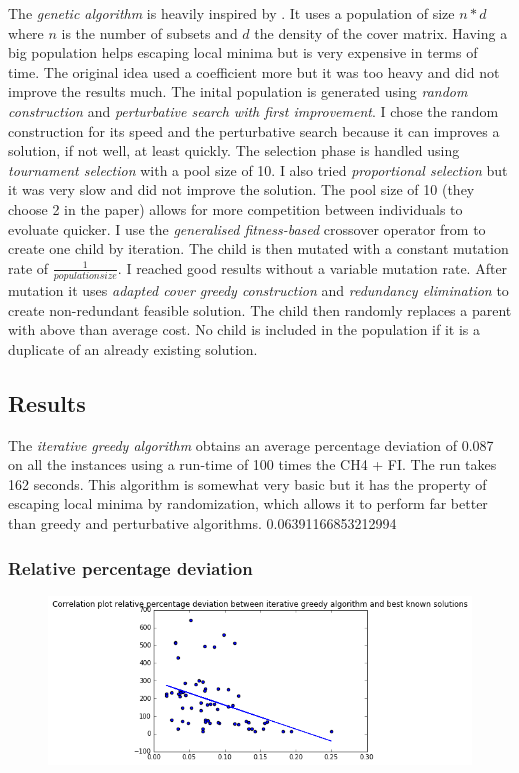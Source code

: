 \documentclass[a4paper,12pt]{article}
\begin{document}
The \textit{genetic algorithm} is heavily inspired by \cite{beasley1996genetic}. 
It uses a population of size $ n * d $ where $ n $ is the number of subsets and $ d $ the density of the cover matrix. Having a big population helps escaping local minima but is very expensive in terms of time. The original idea used a coefficient more but it was too heavy and did not improve the results much.
The inital population is generated using \textit{random construction} and \textit{perturbative search with first improvement}. I chose the random construction for its speed and the perturbative search because it can improves a solution, if not well, at least quickly. 
The selection phase is handled using \textit{tournament selection} with a pool size of 10. I also tried \textit{proportional selection} but it was very slow and did not improve the solution. The pool size of 10 (they choose 2 in the paper) allows for more competition between individuals to evoluate quicker.
I use the \textit{generalised fitness-based} crossover operator from \cite{beasley1996genetic} to create one child by iteration.
The child is then mutated with a constant mutation rate of $ \frac{1}{population size} $. I reached good results without a variable mutation rate.
After mutation it uses \textit{adapted cover greedy construction} and \textit{redundancy elimination} to create non-redundant feasible solution.
The child then randomly replaces a parent with above than average cost. No child is included in the population if it is a duplicate of an already existing solution.

\subsection{Results}

The \textit{iterative greedy algorithm} obtains an average percentage deviation of 0.087 on all the instances using a run-time of 100 times the CH4 + FI. The run takes 162 seconds. This algorithm is somewhat very basic but it has the property of escaping local minima by randomization, which allows it to perform far better than greedy and perturbative algorithms.
0.06391166853212994


\subsubsection{Relative percentage deviation}


\begin{figure}[h]
   \includegraphics[width=\textwidth]{ig.png}
\end{figure}
\end{document}
